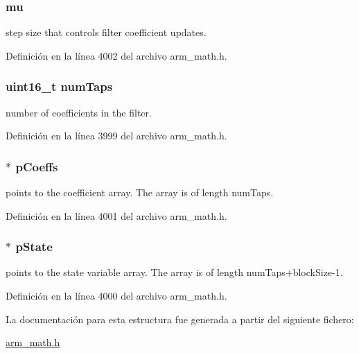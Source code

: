 \subsubsection[{\texorpdfstring{mu}{mu}}]{ mu}\hypertarget{structarm__lms__instance__f32_a11402afa7c9b9dac4cb953fa386e74d2}{}\label{structarm__lms__instance__f32_a11402afa7c9b9dac4cb953fa386e74d2}
step size that controls filter coefficient updates. 

Definición en la línea 4002 del archivo arm\+\_\+math.\+h.

\subsubsection[{\texorpdfstring{num\+Taps}{numTaps}}]{\setlength{\rightskip}{0pt plus 5cm}uint16\+\_\+t num\+Taps}\hypertarget{structarm__lms__instance__f32_a751941891e47f522a7f5375fe8990aac}{}\label{structarm__lms__instance__f32_a751941891e47f522a7f5375fe8990aac}
number of coefficients in the filter. 

Definición en la línea 3999 del archivo arm\+\_\+math.\+h.

\subsubsection[{\texorpdfstring{p\+Coeffs}{pCoeffs}}]{$\ast$ p\+Coeffs}\hypertarget{structarm__lms__instance__f32_aacbb8dd8eeba4b21fc2bb40076405ee3}{}\label{structarm__lms__instance__f32_aacbb8dd8eeba4b21fc2bb40076405ee3}
points to the coefficient array. The array is of length num\+Taps. 

Definición en la línea 4001 del archivo arm\+\_\+math.\+h.

\subsubsection[{\texorpdfstring{p\+State}{pState}}]{$\ast$ p\+State}\hypertarget{structarm__lms__instance__f32_a335c87e6fdc4b96601d95a5de8b9c463}{}\label{structarm__lms__instance__f32_a335c87e6fdc4b96601d95a5de8b9c463}
points to the state variable array. The array is of length num\+Taps+block\+Size-\/1. 

Definición en la línea 4000 del archivo arm\+\_\+math.\+h.



La documentación para esta estructura fue generada a partir del siguiente fichero\+:\begin{DoxyCompactItemize}
\item 
\hyperlink{arm__math_8h}{arm\+\_\+math.\+h}\end{DoxyCompactItemize}
